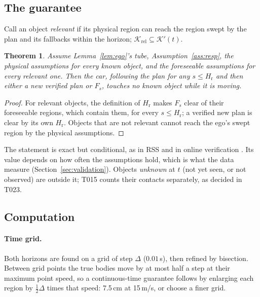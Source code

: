 \documentclass[11pt]{article}
\newtheorem{theorem}{Theorem}
\theoremstyle{definition}
\theoremstyle{remark}
\newcommand{\Hr}{H_{\mathrm{r}}}
\begin{document}
\subsection{The guarantee}\label{sec:guarantee}
Call an object \emph{relevant} if its physical region can reach the region swept by the plan and its
fallbacks within the horizon; $\mathcal K_{\mathrm{rel}}\subseteq\mathcal K'(t)$.
\begin{theorem}\label{thm:guarantee}
Assume Lemma~\ref{lem:ego}'s tube, Assumption~\ref{ass:resp}, the physical assumptions for every known
object, and the foreseeable assumptions for every relevant one. Then the car, following the plan for any
$s\le\Hr$ and then either a new verified plan or $F_s$, touches no known object while it is moving.
\end{theorem}
\begin{proof}
For relevant objects, the definition of $\Hr$ makes $F_s$ clear of their foreseeable regions, which
contain them, for every $s\le\Hr$; a verified new plan is clear by its own $\Hr$. Objects that are not
relevant cannot reach the ego's swept region by the physical assumptions.
\end{proof}
The statement is exact but conditional, as in RSS and in online verification \cite{rss2017,pek2020}.
Its value depends on how often the assumptions hold, which is what the data measure
(Section~\ref{sec:validation}). Objects \emph{unknown} at $t$ (not yet seen, or not observed) are outside
it; T015 counts their contacts separately, as decided in T023.

\subsection{Computation}\label{sec:computation}
\paragraph{Time grid.} Both horizons are found on a grid of step $\Delta$ ($0.01$\,s), then refined by
bisection. Between grid points the true bodies move by at most half a step at their maximum point speed,
so a continuous-time guarantee follows by enlarging each region by $\tfrac12\Delta$ times that speed:
7.5\,cm at 15\,m/s, or choose a finer grid.
\end{document}
